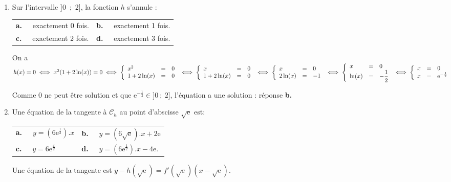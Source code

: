 \begin{enumerate}[resume]
\item Sur l'intervalle ]0~;~2], la fonction $h$ s'annule :

\begin{center}
\begin{tabularx}{\linewidth}{*{2}{X}}
\textbf{a.~~} exactement 0 fois. &\textbf{b.~~} exactement 1 fois.\\
\textbf{c.~~} exactement 2 fois. &\textbf{d.~~} exactement 3 fois.
\end{tabularx}
\end{center}
On a $h(x) = 0 \iff x^2(1 + 2\ln (x)) = 0 \iff \left\{\begin{array}{l c l}
x^2 &=&0\\
1 + 2\ln (x)&=&0
\end{array}\right. \iff \left\{\begin{array}{l c l}
x &=&0\\
1 + 2\ln (x)&=&0
\end{array}\right. \iff \left\{\begin{array}{l c l}
x &=&0\\
2\ln (x)&=&- 1
\end{array}\right. \iff \left\{\begin{array}{l c l}
x &=&0\\
\ln (x)&=&- \dfrac{1}{2}\end{array}\right.\iff \left\{\begin{array}{l c l}
x &=&0\\
x&=&\text{e}^{- \frac{1}{2}}\end{array}\right.$

Comme 0 ne peut être solution et que $\text{e}^{- \frac{1}{2}} \in ]0~;~2]$, l'équation a une solution : réponse \textbf{b.}
\item Une équation de la tangente à $\mathcal{C}_h$ au point d'abscisse $\sqrt{\text{e}}$ est:

\begin{center}
\begin{tabularx}{\linewidth}{*{2}{X}}
\textbf{a.~~} $y = \left(6\text{e}^{\frac12}\right).{} x $&
\textbf{b.~~} $y = \left(6\sqrt{\text{e}}\right).{} x + 2\text{e}$\\
\textbf{c.~~} $y = 6\text{e}^{\frac{x}{2}}$
&\textbf{d.~~} $y = \left(6\text{e}^{\frac12}\right) .{} x - 4\text{e}$.
\end{tabularx}
\end{center}
Une équation de la tangente est $y - h\left(\sqrt{\text{e}}\right) = f'\left(\sqrt{\text{e}}\right)\left(x - \sqrt{\text{e}}\right)$.


\end{enumerate}
